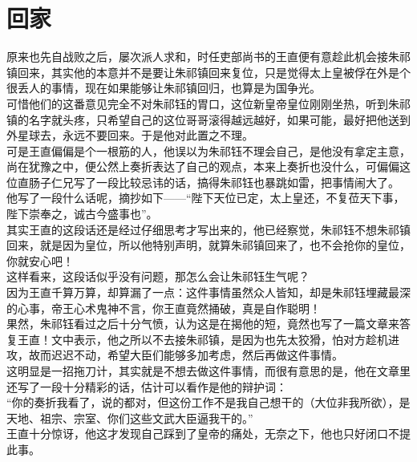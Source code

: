 \section{回家}
\ifnum{}
	\begin{multicols}{\theparacolNo}
\fi
原来也先自战败之后，屡次派人求和，时任吏部尚书的王直便有意趁此机会接朱祁镇回来，其实他的本意并不是要让朱祁镇回来复位，只是觉得太上皇被俘在外是个很丢人的事情，现在如果能够让朱祁镇回归，也算是为国争光。\\

可惜他们的这番意见完全不对朱祁钰的胃口，这位新皇帝皇位刚刚坐热，听到朱祁镇的名字就头疼，只希望自己的这位哥哥滚得越远越好，如果可能，最好把他送到外星球去，永远不要回来。于是他对此置之不理。\\

可是王直偏偏是个一根筋的人，他误以为朱祁钰不理会自己，是他没有拿定主意，尚在犹豫之中，便公然上奏折表达了自己的观点，本来上奏折也没什么，可偏偏这位直肠子仁兄写了一段比较忌讳的话，搞得朱祁钰也暴跳如雷，把事情闹大了。\\

他写了一段什么话呢，摘抄如下——“陛下天位已定，太上皇还，不复莅天下事，陛下崇奉之，诚古今盛事也”。\\

其实王直的这段话还是经过仔细思考才写出来的，他已经察觉，朱祁钰不想朱祁镇回来，就是因为皇位，所以他特别声明，就算朱祁镇回来了，也不会抢你的皇位，你就安心吧！\\

这样看来，这段话似乎没有问题，那怎么会让朱祁钰生气呢？\\

因为王直千算万算，却算漏了一点：这件事情虽然众人皆知，却是朱祁钰埋藏最深的心事，帝王心术鬼神不言，你王直竟然捅破，真是自作聪明！\\

果然，朱祁钰看过之后十分气愤，认为这是在揭他的短，竟然也写了一篇文章来答复王直！文中表示，他之所以不去接朱祁镇，是因为也先太狡猾，怕对方趁机进攻，故而迟迟不动，希望大臣们能够多加考虑，然后再做这件事情。\\

这明显是一招拖刀计，其实就是不想去做这件事情，而很有意思的是，他在文章里还写了一段十分精彩的话，估计可以看作是他的辩护词：\\

“你的奏折我看了，说的都对，但这份工作不是我自己想干的（大位非我所欲），是天地、祖宗、宗室、你们这些文武大臣逼我干的。”\\

王直十分惊讶，他这才发现自己踩到了皇帝的痛处，无奈之下，他也只好闭口不提此事。\\


\end{multicols}
